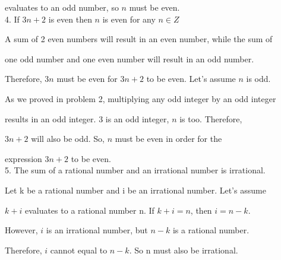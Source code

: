 \documentclass[10pt]{article}
\begin{document}
evaluates to an odd number, so $n$ must be even. \\[\baselineskip]

4. If $3n+2$ is even then $n$ is even for any $n\in Z$ 

A sum of 2 even numbers will result in an even number, while the sum of 

one odd number and one even number will result in an odd number. 

Therefore, $3n$ must be even for $3n+2$ to be even. Let's assume $n$ is odd. 

As we proved in problem 2, multiplying any odd integer by an odd integer 

results in an odd integer. 3 is an odd integer, $n$ is too. Therefore, 

$3n+2$ will also be odd. So, $n$ must be even in order for the

expression $3n+2$ to be even. \\[\baselineskip]

5. The sum of a rational number and an irrational number is irrational.

Let k be a rational number and i be an irrational number. Let's assume

$k+i$ evaluates to a rational number n. If $k+i=n$, then $i=n-k$.

However, $i$ is an irrational number, but $n-k$ is a rational number.

Therefore, $i$ cannot equal to $n-k$. So n must also be irrational. 
\end{document}
